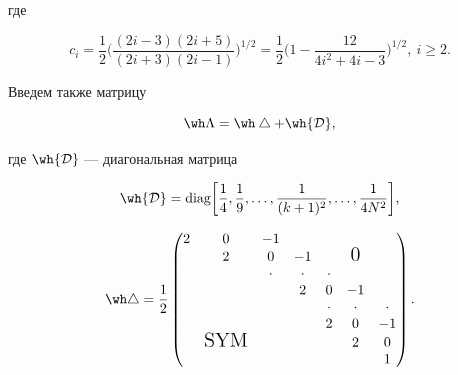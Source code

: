 где


\begin{equation}


c_i=\frac{1}{2}\bigg(


\frac{(2i-3)(2i+5)}{(2i+3)(2i-1)}\bigg)^{1/2}=


\frac{1}{2}\bigg(1-\frac{12}{4i^2+4i-3}\bigg)^{1/2},\ i\ge2.


\label{1.4}


\end{equation}


Введем также матрицу


\begin{equation}


\wh\Lambda=\wh\bigtriangleup+\wh{\cal D},


\label{1.5}


\end{equation}


где $\wh{\cal D}$ --- диагональная матрица


\begin{equation}


\wh{\cal D}=\text{diag}\bigg[


\frac{1}{4},\frac{1}{9},\dotsc,\frac{1}{(k+1)^2},\dotsc,


\frac {1}{4N^2}\bigg],


\label{1.6}


\end{equation}


\begin{equation}


\wh\bigtriangleup=\frac{1}{2}


\begin{pmatrix}


2 & 0 & -1 & & & & \\


& 2 & 0 & -1 & & \text{\Large 0} & \\


& & \cdot & \cdot & \cdot & & \\


& & & 2 & 0 &-1 & \\


& & & & \cdot &\cdot &\cdot \\


& & & & 2 & 0 & -1 \\


& \text{\Large SYM} & & & & 2 & 0 \\


& & & & & & 1 \\


\end{pmatrix}.


\label{1.7}


\end{equation}


